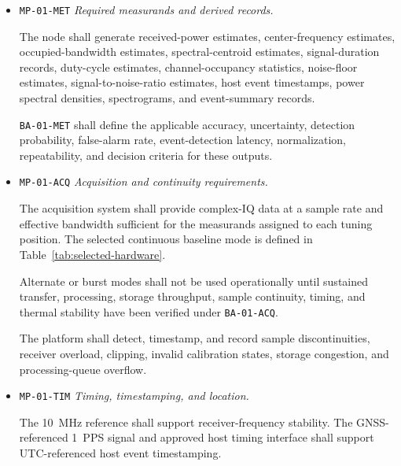 \documentclass[11pt,a4paper]{article}
\begin{document}
\begin{itemize}[leftmargin=*]
		\texttt{SP-01} shall also state the minimum event duration expected to be
		observable and the accepted risk of missing short-duration events created
		by sequential scanning. It shall be derived from \texttt{MP-01},
		registered in \texttt{VTM-01}, and verified as feasible before operational
		acquisition begins.
		
		Portable survey operation, simultaneous multiband observation, distributed
		synchronization, direction finding, TDOA, and emitter geolocation are
		outside the approved baseline.
		
		\item \texttt{MP-01-MET} \emph{Required measurands and derived records.}
		
		The node shall generate received-power estimates, center-frequency
		estimates, occupied-bandwidth estimates, spectral-centroid estimates,
		signal-duration records, duty-cycle estimates, channel-occupancy
		statistics, noise-floor estimates, signal-to-noise-ratio estimates, host
		event timestamps, power spectral densities, spectrograms, and event-summary
		records.
		
		\texttt{BA-01-MET} shall define the applicable accuracy, uncertainty,
		detection probability, false-alarm rate, event-detection latency,
		normalization, repeatability, and decision criteria for these outputs.
		
		\item \texttt{MP-01-ACQ} \emph{Acquisition and continuity requirements.}
		
		The acquisition system shall provide complex-IQ data at a sample rate and
		effective bandwidth sufficient for the measurands assigned to each tuning
		position. The selected continuous baseline mode is defined in
		Table~\ref{tab:selected-hardware}.
		
		Alternate or burst modes shall not be used operationally until sustained
		transfer, processing, storage throughput, sample continuity, timing,
		and thermal stability have been verified under \texttt{BA-01-ACQ}.
		
		The platform shall detect, timestamp, and record sample discontinuities,
		receiver overload, clipping, invalid calibration states, storage
		congestion, and processing-queue overflow.
		
		\item \texttt{MP-01-TIM} \emph{Timing, timestamping, and location.}
		
		The 10~MHz reference shall support receiver-frequency stability. The
		GNSS-referenced 1~PPS signal and approved host timing interface shall
		support UTC-referenced host event timestamping.
		

\end{itemize}
\end{document}
